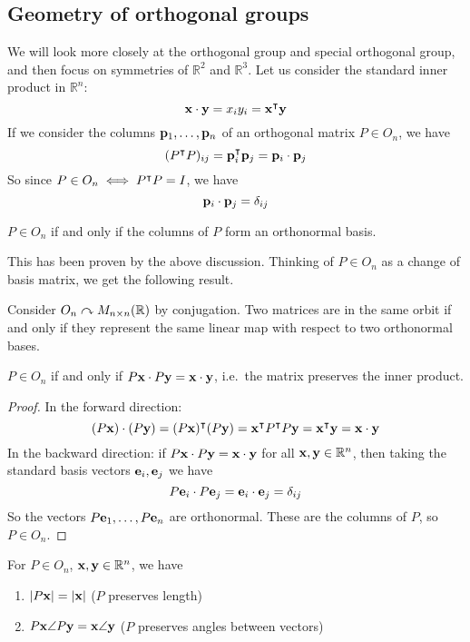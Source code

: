 \subsection{Geometry of orthogonal groups}
We will look more closely at the orthogonal group and special orthogonal group, and then focus on symmetries of \(\mathbb R^2\) and \(\mathbb R^3\).
Let us consider the standard inner product in \(\mathbb R^n\):
\[
	\vb x \cdot \vb y = x_i y_i = \vb x^\intercal \vb y
\]
If we consider the columns \(\vb p_1, \dots, \vb p_n\) of an orthogonal matrix \(P \in O_n\), we have
\[
	(P^\intercal P)_{ij} = \vb p_i^\intercal \vb p_j = \vb p_i \cdot \vb p_j
\]
So since \(P \in O_n \iff P^\intercal P = I\), we have
\[
	\vb p_i \cdot \vb p_j = \delta_{ij}
\]
\begin{proposition}
	\(P \in O_n\) if and only if the columns of \(P\) form an orthonormal basis.
\end{proposition}
This has been proven by the above discussion.
Thinking of \(P \in O_n\) as a change of basis matrix, we get the following result.
\begin{proposition}
	Consider \(O_n \curvearrowright M_{n \times n}(\mathbb R)\) by conjugation.
	Two matrices are in the same orbit if and only if they represent the same linear map with respect to two orthonormal bases.
\end{proposition}
\begin{proposition}
	\(P \in O_n\) if and only if \(P \vb x \cdot P \vb y = \vb x \cdot \vb y\), i.e.\ the matrix preserves the inner product.
\end{proposition}
\begin{proof}
	In the forward direction:
	\[
		(P\vb x) \cdot (P \vb y) = (P \vb x)^\intercal (P \vb y) = \vb x^\intercal P^\intercal P \vb y = \vb x^\intercal \vb y = \vb x \cdot \vb y
	\]
	In the backward direction: if \(P\vb x \cdot P\vb y = \vb x \cdot \vb y\) for all \(\vb x, \vb y \in \mathbb R^n\), then taking the standard basis vectors \(\vb e_i, \vb e_j\) we have
	\[
		P\vb e_i \cdot P\vb e_j = \vb e_i \cdot \vb e_j = \delta_{ij}
	\]
	So the vectors \(P\vb e_1, \dots, P\vb e_n\) are orthonormal.
	These are the columns of \(P\), so \(P \in O_n\).
\end{proof}
\begin{corollary}
	For \(P \in O_n\), \(\vb x, \vb y \in \mathbb R^n\), we have
	\begin{enumerate}
		\item \(\abs{P\vb x} = \abs{\vb x}\) (\(P\) preserves length)
		\item \(P\vb x \angle P\vb y = \vb x \angle \vb y\) (\(P\) preserves angles between vectors)
	\end{enumerate}
\end{corollary}
